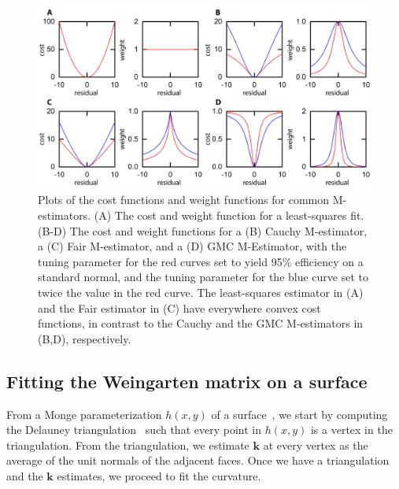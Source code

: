 \begin{figure}[H]
  \centering
  \includegraphics{figures/C3/Ch3-Figs_IRLSfxn.png}
  \caption{Plots of the cost functions and weight functions for common M-estimators.
  (A) The cost and weight function for a least-squares fit.
  (B-D) The cost and weight functions for a (B) Cauchy M-estimator, a (C) Fair M-estimator, and a (D) GMC M-Estimator, with the tuning parameter for the red curves set to yield 95\% efficiency on a standard normal, and the tuning parameter for the blue curve set to twice the value in the red curve.
  The least-squares estimator in (A) and the Fair estimator in (C) have everywhere convex cost functions, in contrast to the Cauchy and the GMC M-estimators in (B,D), respectively.}\label{f:3-CostFxn}
\end{figure}
\newpage
\subsection{Fitting the Weingarten matrix on a surface}
From a Monge parameterization $h(x,y)$ of a surface~\cite{RN35,RN23}, we start by computing the Delauney triangulation~\cite{RN34} such that every point in $h(x,y)$ is a vertex in the triangulation.
From the triangulation, we estimate $\mathbf{k}$ at every vertex as the average of the unit normals of the adjacent faces.
Once we have a triangulation and the $\mathbf{k}$ estimates, we proceed to fit the curvature.

